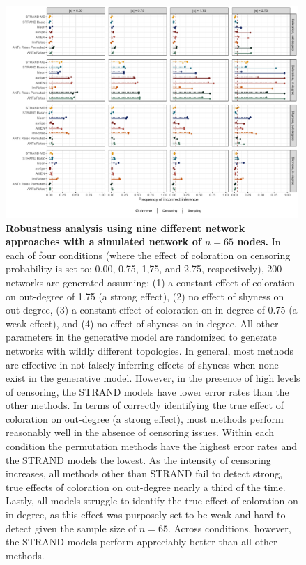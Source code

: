 \documentclass[Afour,sageh,times]{sagej}
\begin{document}
\begin{figure}[t]
  \caption{\textbf{Robustness analysis using nine different network approaches with a simulated network of $n=65$ nodes.} In each of four conditions (where the effect of coloration on censoring probability is set to: 0.00, 0.75, 1,75, and 2.75, respectively), 200 networks are generated assuming: (1) a constant effect of coloration on out-degree of 1.75 (a strong effect), (2) no effect of shyness on out-degree, (3) a constant effect of coloration on in-degree of 0.75 (a weak effect), and (4) no effect of shyness on in-degree. All other parameters in the generative model are randomized to generate networks with wildly different topologies. In general, most methods are effective in not falsely inferring effects of shyness when none exist in the generative model. However, in the presence of high levels of censoring, the STRAND models have lower error rates than the other methods. In terms of correctly identifying the true effect of coloration on out-degree (a strong effect), most methods perform reasonably well in the absence of censoring issues. Within each condition the permutation methods have the highest error rates and the STRAND models the lowest. As the intensity of censoring increases, all methods other than STRAND fail to detect strong, true effects of coloration on out-degree nearly a third of the time. Lastly, all models struggle to identify the true effect of coloration on in-degree, as this effect was purposely set to be weak and hard to detect given the sample size of $n=65$. Across conditions, however, the STRAND models perform appreciably better than all other methods. 
  }  \label{blast3}
  \centering
      \includegraphics[width=0.99\textwidth]{Figures/Robustness_Freq}
\end{figure}
\end{document}
